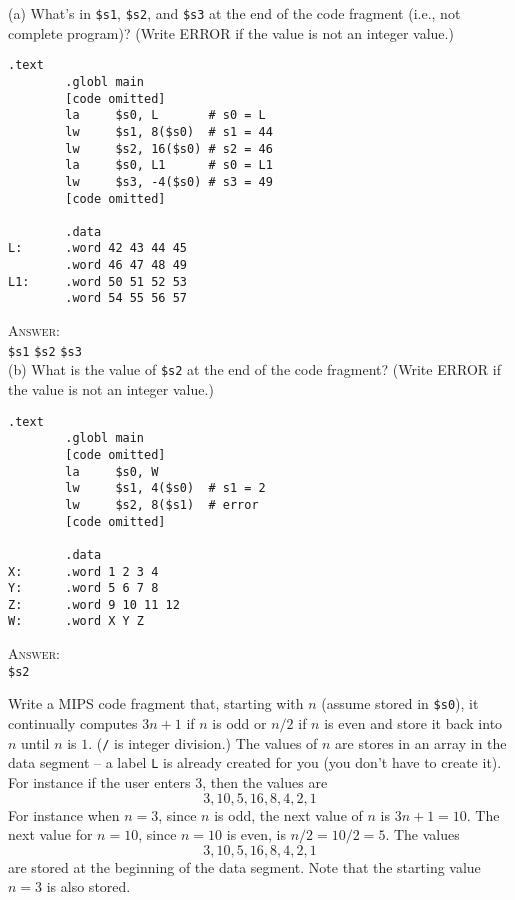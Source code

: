 (a) What's in \verb!$s1!, \verb!$s2!, and \verb!$s3!
at the end of the code fragment (i.e., not complete program)?
(Write ERROR if the value is not an integer value.)
\begin{Verbatim}[frame=single,fontsize=\small]
        .text
        .globl main        
        [code omitted]
        la     $s0, L       # s0 = L
        lw     $s1, 8($s0)  # s1 = 44
        lw     $s2, 16($s0) # s2 = 46
        la     $s0, L1      # s0 = L1
        lw     $s3, -4($s0) # s3 = 49
        [code omitted]
        
        .data
L:      .word 42 43 44 45
        .word 46 47 48 49
L1:     .word 50 51 52 53
        .word 54 55 56 57
\end{Verbatim}
\textsc{Answer:}
\\
\verb!$s1!  \hspace{1cm}
\verb!$s2!  \hspace{1cm}
\verb!$s3!  \\

(b)
What is the value of \verb!$s2! at the end of the code fragment?
(Write ERROR if the value is not an integer value.)
\begin{Verbatim}[frame=single,fontsize=\small]
        .text
        .globl main        
        [code omitted]
        la     $s0, W       
        lw     $s1, 4($s0)  # s1 = 2
        lw     $s2, 8($s1)  # error
        [code omitted]
        
        .data
X:      .word 1 2 3 4
Y:      .word 5 6 7 8
Z:      .word 9 10 11 12
W:      .word X Y Z
\end{Verbatim}
\textsc{Answer:} \\
\verb!$s2! 

\newpage
\nextq
Write a MIPS code fragment that, starting with $n$ (assume stored in
\verb!$s0!),
it
continually computes $3n + 1$ if $n$ is odd or $n/2$
if $n$ is even
and store it back into $n$ until $n$ is $1$.
(\verb!/! is integer division.)
The values of $n$ are stores in an array in the data segment --
a label \verb!L! is already created for you (you don't have to create it).
For instance if the user
enters $3$, then the values are
\[
  3, 10, 5, 16, 8, 4, 2, 1
\]
For instance when $n = 3$, since $n$ is odd,
the next value of $n$ is $3n + 1 = 10$.
The next value for $n = 10$, since $n = 10$ is even,
is $n / 2 = 10 / 2 = 5$.
The values
\[
  3, 10, 5, 16, 8, 4, 2, 1
\]
are stored at the beginning of the data
segment.
Note that the starting value $n = 3$ is also stored.

